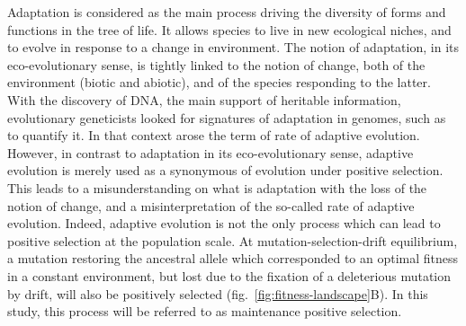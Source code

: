 \documentclass{article}
\newcommand{\NS}[1]{\textcolor{red}{\textbf{\emph{[NS: #1]}}}}
\begin{document}
    Adaptation is considered as the main process driving the diversity of forms and functions in the tree of life\cite{darwin_origin_1859}.
    It allows species to live in new ecological niches, and to evolve in response to a change in environment\cite{darwin_origin_1859, merrell_adaptive_1994}.
    The notion of adaptation, in its eco-evolutionary sense, is tightly linked to the notion of change, both of the environment (biotic and abiotic), and of the species responding to the latter\cite{merrell_adaptive_1994}.
    With the discovery of DNA, the main support of heritable information, evolutionary geneticists looked for signatures of adaptation in genomes, such as to quantify it\cite{mcdonald_adaptative_1991, eyre-walker_distribution_2006}.
    In that context arose the term of rate of adaptive evolution\cite{mcdonald_adaptative_1991, eyre-walker_distribution_2006, galtier_adaptive_2016}.
    However, in contrast to adaptation in its eco-evolutionary sense, adaptive evolution is merely used as a synonymous of evolution under positive selection\cite{eyre-walker_distribution_2006}.
    This leads to a misunderstanding on what is adaptation with the loss of the notion of change, and a misinterpretation of the so-called rate of adaptive evolution.
    Indeed, adaptive evolution is not the only process which can lead to positive selection at the population scale\cite{sella_application_2005, mustonen_fitness_2009}.
    At mutation-selection-drift equilibrium, a mutation restoring the ancestral allele which corresponded to an optimal fitness in a constant environment, but lost due to the fixation of a deleterious mutation by drift, will also be positively selected (fig.~\ref{fig:fitness-landscape}B).
    In this study, this process will be referred to as maintenance positive selection.
\end{document}

